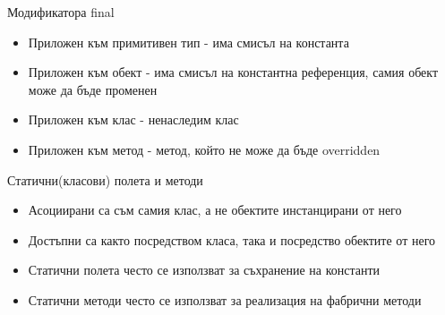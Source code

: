 \documentclass{beamer}
\begin{document}
\begin{frame}{Модификатора final}
  \transdissolve
  \begin{itemize}
  \item Приложен към примитивен тип -  има
    смисъл на константа
  \item Приложен към обект -  има смисъл на
    константна референция, самия обект
    може да бъде променен
  \item Приложен към клас -  ненаследим клас
  \item Приложен към метод -  метод, който не
    може да бъде overridden
  \end{itemize}
\end{frame}

\begin{frame}{Статични(класови) полета и методи}
  \transdissolve
  \begin{itemize}
  \item Асоциирани са съм самия клас, а не
    обектите инстанцирани от него
  \item Достъпни са както посредством класа,
    така и посредство обектите от него
  \item Статични полета често се използват за
    съхранение на константи
  \item Статични методи често се използват за
    реализация на фабрични методи
  \end{itemize}
\end{frame}
\end{document}
